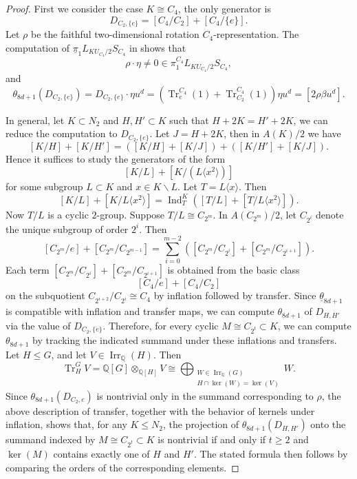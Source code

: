 \documentclass{amsart}
\theoremstyle{plain}
\theoremstyle{definition}
\theoremstyle{remark}
\begin{document}
\begin{proof}
    First we consider the case $K\cong C_4$, the only generator is 
    \[
    D_{C_2,\{e\}} = [C_4/C_2] + [C_4/\{e\}].
    \]
    Let $\rho$ be the faithful two-dimensional rotation $C_4$-representation. The computation of $\underline{\pi}_1 L_{KU_{C_4}/2}S_{C_4}$ in  shows that $$\rho\cdot \eta \neq 0\in \pi_1^{C_4}L_{KU_{C_4}/2}S_{C_4},$$ 
    and 
    \[\theta_{8d+1}(D_{C_2,\{e\}})=D_{C_2,\{e\}} \cdot \eta u^d = (\operatorname{Tr}_{e}^{C_4}(1)+\operatorname{Tr}_{C_2}^{C_4}(1))\eta u^d = [2\rho \beta u^d].\] 

    In general, let $K\subset N_2$ and $H,H'\subset K$ such that $H+2K=H'+2K$, we can reduce the computation to $D_{C_2,\{e\}}$. Let $J = H +2 K $, then in $A(K)/2$ we have
    \[
    [K/H] + [K/H'] = ([K/H] + [K/J]) + ([K/H'] + [K/J]).
    \]
    Hence it suffices to study the generators of the form
    \[
    [K/L] + [K/(L\langle x^2 \rangle)]
    \]
    for some subgroup $L\subset K$ and $x\in K\backslash L$.
    Let $T = L \langle x \rangle$. Then
    \[
    [K/L] + [K/L \langle x^2 \rangle] = \operatorname{Ind}_T^K ([T/L] + [T/L \langle x^2 \rangle]).
    \]
    Now $T/L$ is a cyclic $2$-group. Suppose $T/L \cong C_{2^m}$.
    In $A(C_{2^m})/2$, let $C_{2^i}$ denote the unique subgroup of order $2^i$. Then
    \[
    [C_{2^m}/e] + [C_{2^m}/C_{2^{m-1}}] = \sum_{i=0}^{m-2} ([C_{2^m}/C_{2^i}] + [C_{2^m}/C_{2^{i+1}}]).
    \]
    Each term $[C_{2^m}/C_{2^i}] + [C_{2^m}/C_{2^{i+1}}]$ is obtained from the basic class
    \[
    [C_4/e] + [C_4/C_2]
    \]
    on the subquotient $C_{2^{i+2}}/C_{2^i} \cong C_4$ by inflation followed by transfer. Since $\underline{\theta}_{8d+1}$ is compatible with inflation and transfer maps, we can compute $\theta_{8d+1}$ of $D_{H,H'}$ via the value of $D_{C_2,\{e\}}$. Therefore, for every cyclic $M\cong C_{2^t} \subset K$, we can compute $\theta_{8d+1}$ by tracking the indicated summand under these inflations and transfers. Let \(H\leq G\), and let \(V\in\operatorname{Irr}_{\mathbb Q}(H)\). Then
    \[
    \operatorname{Tr}_H^G V
    =
    \mathbb Q[G]\otimes_{\mathbb Q[H]}V
    \cong
    \bigoplus_{\substack{
    W\in\operatorname{Irr}_{\mathbb Q}(G)\\
    H\cap\ker(W)=\ker(V)
    }}
    W.
    \]
    Since $\theta_{8d+1}(D_{C_2,{e}})$ is nontrivial only in the summand corresponding to $\rho$, the above description of transfer, together with the behavior of kernels under inflation, shows that, for any $K\leq N_2$, the projection of $\theta_{8d+1}(D_{H,H'})$ onto the summand indexed by $M\cong C_{2^t}\subset K$ is nontrivial if and only if $t\geq 2$ and $\ker(M)$ contains exactly one of $H$ and $H'$. The stated formula then follows by comparing the orders of the corresponding elements.
\end{proof}
\end{document}
